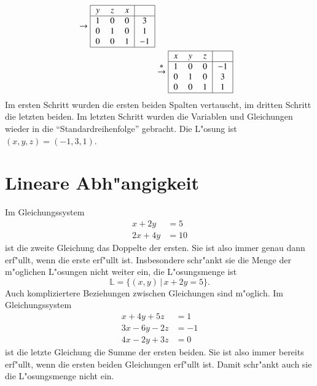 \begin{beispiel}[\bf Beispiel]
\begin{align*}
\begin{tabular}{|>{$}c<{$}>{$}c<{$}>{$}c<{$}|>{$}c<{$}|}
\hline
\end{tabular}
\rightarrow
\begin{tabular}{|>{$}c<{$}>{$}c<{$}>{$}c<{$}|>{$}c<{$}|}
\hline
y&z&x&\\
\hline
1&0&0&3\\
0&1&0&1\\
0&0&1&-1\\
\hline
\end{tabular}
\\
&\overset{\displaystyle *}{\rightarrow}
\begin{tabular}{|>{$}c<{$}>{$}c<{$}>{$}c<{$}|>{$}c<{$}|}
\hline
x&y&z&\\
\hline
1&0&0&-1\\
0&1&0&3\\
0&0&1&1\\
\hline
\end{tabular}
\end{align*}
Im ersten Schritt wurden die ersten beiden
Spalten vertauscht, im dritten Schritt die letzten
beiden. Im letzten Schritt wurden die Variablen
und Gleichungen wieder in die ``Standardreihenfolge'' gebracht.
Die L"osung ist $(x,y,z)=(-1, 3, 1)$.
\end{beispiel}

\section{Lineare Abh"angigkeit}
Im Gleichungssystem
\begin{align*}
x+2y&=5\\
2x+4y&=10
\end{align*}
ist die zweite Gleichung das Doppelte der ersten. Sie ist
also immer genau dann erf"ullt, wenn die erste erf"ullt ist.
Insbesondere schr"ankt sie die Menge der m"oglichen L"osungen
nicht weiter ein, die L"osungsmenge ist
$$\mathbb L=\{(x,y)\,|\, x+2y=5\}.$$
Auch kompliziertere Beziehungen zwischen Gleichungen sind
m"oglich. Im Gleichungssystem
\begin{align*}
 x+4y+5z&=1\\
3x-6y-2z&=-1\\
4x-2y+3z&=0
\end{align*}
ist die letzte Gleichung die Summe der ersten beiden. Sie ist also
immer bereits erf"ullt, wenn die ersten beiden Gleichungen erf"ullt
ist. Damit schr"ankt auch sie die L"osungsmenge nicht ein.

